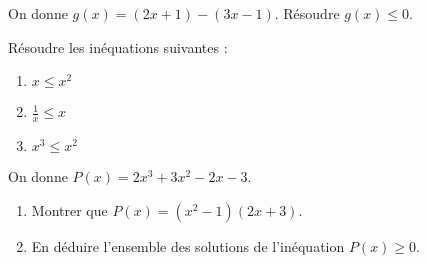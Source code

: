 \begin{multicols}{2}
\begin{prob}
 On donne $g(x)=(2x+1) - (3x-1)$. R\'esoudre $g(x)\leqslant0$.
\end{prob}


\begin{prob}
Résoudre les inéquations suivantes :
\vspace{-1em}\begin{multicols}{3}
\begin{enumerate}
	\item $x\leqslant x^2$
	\item $\frac{1}{x}\leqslant x$
	\item $x^3\leqslant x^2$
\end{enumerate}
\end{multicols}
\end{prob}

\begin{prob}
 On donne $P(x)=2x^3+3x^2-2x-3$.
\begin{enumerate}
 \item Montrer que $P(x)=(x^2-1)(2x+3)$.
 \item En d\'eduire l'ensemble des solutions de l'in\'equation $P(x)\geqslant0$.
\end{enumerate}

\end{prob}







\end{multicols}
